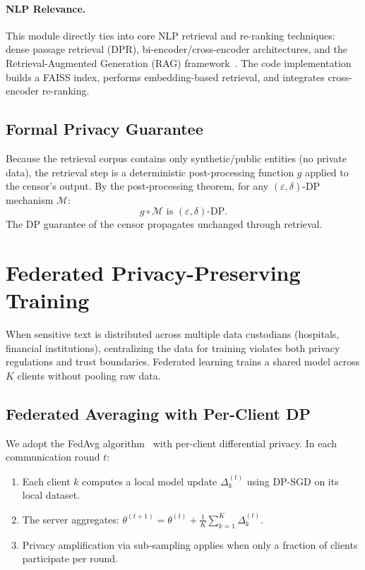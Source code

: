 \documentclass[11pt, a4paper]{article}
\begin{document}
\paragraph{NLP Relevance.}
This module directly ties into core NLP retrieval and re-ranking techniques: dense passage retrieval (DPR), bi-encoder/cross-encoder architectures, and the Retrieval-Augmented Generation (RAG) framework~\cite{lewis2020rag}.  The code implementation builds a FAISS index, performs embedding-based retrieval, and integrates cross-encoder re-ranking.

\subsection{Formal Privacy Guarantee}

Because the retrieval corpus contains only synthetic/public entities (no private data), the retrieval step is a deterministic post-processing function $g$ applied to the censor's output.  By the post-processing theorem, for any $(\varepsilon,\delta)$-DP mechanism $\mathcal{M}$:
\[
  g \circ \mathcal{M} \text{ is } (\varepsilon, \delta)\text{-DP}.
\]
The DP guarantee of the censor propagates unchanged through retrieval.


\section{Federated Privacy-Preserving Training}
\label{sec:federated}

When sensitive text is distributed across multiple data custodians (hospitals, financial institutions), centralizing the data for training violates both privacy regulations and trust boundaries.  Federated learning trains a shared model across $K$ clients without pooling raw data.

\subsection{Federated Averaging with Per-Client DP}

We adopt the FedAvg algorithm~\cite{mcmahan2017federated} with per-client differential privacy.  In each communication round $t$:
\begin{enumerate}
  \item Each client $k$ computes a local model update $\Delta_k^{(t)}$ using DP-SGD on its local dataset.
  \item The server aggregates: $\theta^{(t+1)} = \theta^{(t)} + \frac{1}{K}\sum_{k=1}^{K} \Delta_k^{(t)}$.
  \item Privacy amplification via sub-sampling applies when only a fraction of clients participate per round.
\end{enumerate}
\end{document}

